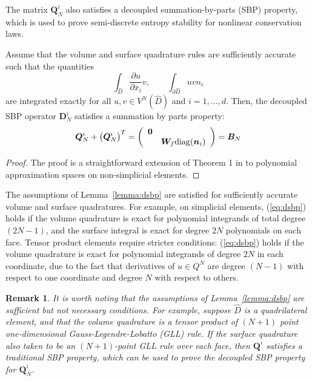 \documentclass[review]{siamart0216}
\newtheorem*{remark}{Remark}
\theoremstyle{assumption}
\renewcommand{\hat}[1]{\hat{#1}}
\newcommand{\pd}[2]{\frac{\partial#1}{\partial#2}}
\newcommand{\LRp}[1]{\left( #1 \right)}
\renewcommand{\hat}{\widehat}
\begin{document}
The matrix $\bm{Q}^i_N$ also satisfies a decoupled summation-by-parts (SBP) property, which is used to prove semi-discrete entropy stability for nonlinear conservation laws.  
\begin{lemma}
Assume that the volume and surface quadrature rules are sufficiently accurate such that the quantities
\[
\int_{\hat{D}} \pd{u}{x_i} v, \qquad \int_{\partial \hat{D}} u v n_i
\]
are integrated exactly for all $u,v \in V^N\LRp{\hat{D}}$ and $i = 1,\ldots, d$.  Then, the decoupled SBP operator $\bm{D}^i_N$ satisfies a summation by parts property:
\begin{gather}
\bm{Q}^i_N+\LRp{\bm{Q}^i_N}^T = \LRp{\begin{array}{cc}\bm{0}&\\ & \bm{W}_f {\rm diag}(\bm{n}_i)\end{array}} = \bm{B}_N\label{eq:dsbp}
\end{gather}
\label{lemma:dsbp}
\end{lemma}
\begin{proof}
The proof is a straightforward extension of Theorem 1 in \cite{chan2017discretely} to polynomial approximation spaces on non-simplicial elements.  
\end{proof}

The assumptions of Lemma~\ref{lemma:dsbp} are satisfied for sufficiently accurate volume and surface quadratures.  For example, on simplicial elements, (\ref{eq:dsbp}) holds if the volume quadrature is exact for polynomial integrands of total degree $(2N-1)$, and the surface integral is exact for degree $2N$ polynomials on each face.  Tensor product elements require stricter conditions: (\ref{eq:dsbp}) holds if the volume quadrature is exact for polynomial integrands of degree $2N$ in each coordinate, due to the fact that derivatives of $u\in Q^N$ are degree $(N-1)$ with respect to one coordinate and degree $N$ with respect to others.  

\begin{remark}
It is worth noting that the assumptions of Lemma~\ref{lemma:dsbp} are sufficient but not necessary conditions.  For example, suppose $\hat{D}$ is a quadrilateral element, and that the volume quadrature is a tensor product of $(N+1)$ point one-dimensional Gauss-Legendre-Lobatto (GLL) rule.  If the surface quadrature also taken to be an $(N+1)$-point GLL rule over each face, then $\bm{Q}^i$ satisfies a traditional SBP property, which can be used to prove the decoupled SBP property for $\bm{Q}^i_N$.  
\end{remark}
\end{document}
